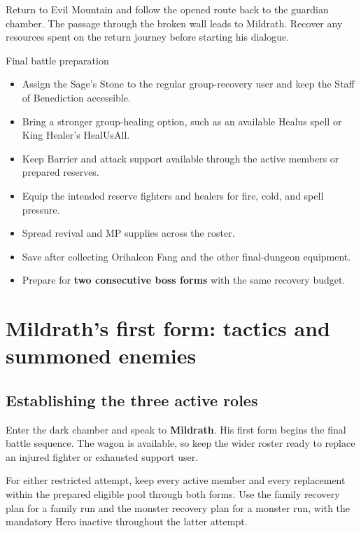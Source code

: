 Return to Evil Mountain and follow the opened route back
to the guardian chamber. The passage through the broken
wall leads to Mildrath. Recover any resources spent on
the return journey before starting his dialogue.

\begin{routecheck}{Final battle preparation}
\begin{itemize}
  \item Assign the Sage's Stone to the regular group-recovery
    user and keep the Staff of Benediction accessible.
  \item Bring a stronger group-healing option, such as an
    available Healus spell or King Healer's HealUsAll.
  \item Keep Barrier and attack support available through
    the active members or prepared reserves.
  \item Equip the intended reserve fighters and healers
    for fire, cold, and spell pressure.
  \item Spread revival and MP supplies across the roster.
  \item Save after collecting Orihalcon Fang and the other
    final-dungeon equipment.
  \item Prepare for \textbf{two consecutive boss forms}
    with the same recovery budget.
\end{itemize}
\end{routecheck}

\section{Mildrath's first form: tactics and summoned enemies}

\subsection*{Establishing the three active roles}

Enter the dark chamber and speak to \textbf{Mildrath}.
His first form begins the final battle sequence.
The wagon is available, so keep the wider roster ready
to replace an injured fighter or exhausted support user.

For either restricted attempt, keep every active member and every
replacement within the prepared eligible pool through both forms.
Use the family recovery plan for a family run and the monster recovery
plan for a monster run, with the mandatory Hero inactive throughout
the latter attempt.

